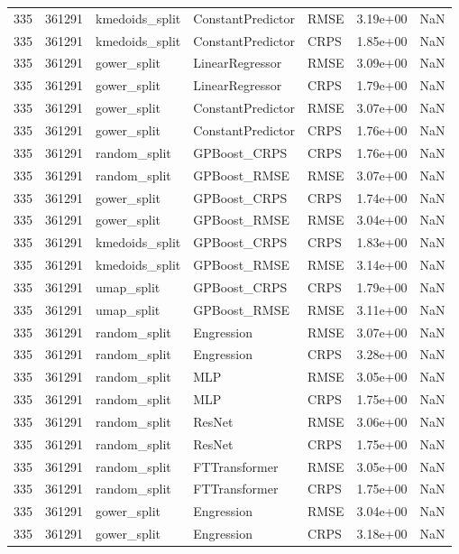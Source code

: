 \begin{tabular}{rrlllrr}
335 & 361291 & kmedoids\_split & ConstantPredictor & RMSE & 3.19e+00 & NaN \\
335 & 361291 & kmedoids\_split & ConstantPredictor & CRPS & 1.85e+00 & NaN \\
335 & 361291 & gower\_split & LinearRegressor & RMSE & 3.09e+00 & NaN \\
335 & 361291 & gower\_split & LinearRegressor & CRPS & 1.79e+00 & NaN \\
335 & 361291 & gower\_split & ConstantPredictor & RMSE & 3.07e+00 & NaN \\
335 & 361291 & gower\_split & ConstantPredictor & CRPS & 1.76e+00 & NaN \\
335 & 361291 & random\_split & GPBoost\_CRPS & CRPS & 1.76e+00 & NaN \\
335 & 361291 & random\_split & GPBoost\_RMSE & RMSE & 3.07e+00 & NaN \\
335 & 361291 & gower\_split & GPBoost\_CRPS & CRPS & 1.74e+00 & NaN \\
335 & 361291 & gower\_split & GPBoost\_RMSE & RMSE & 3.04e+00 & NaN \\
335 & 361291 & kmedoids\_split & GPBoost\_CRPS & CRPS & 1.83e+00 & NaN \\
335 & 361291 & kmedoids\_split & GPBoost\_RMSE & RMSE & 3.14e+00 & NaN \\
335 & 361291 & umap\_split & GPBoost\_CRPS & CRPS & 1.79e+00 & NaN \\
335 & 361291 & umap\_split & GPBoost\_RMSE & RMSE & 3.11e+00 & NaN \\
335 & 361291 & random\_split & Engression & RMSE & 3.07e+00 & NaN \\
335 & 361291 & random\_split & Engression & CRPS & 3.28e+00 & NaN \\
335 & 361291 & random\_split & MLP & RMSE & 3.05e+00 & NaN \\
335 & 361291 & random\_split & MLP & CRPS & 1.75e+00 & NaN \\
335 & 361291 & random\_split & ResNet & RMSE & 3.06e+00 & NaN \\
335 & 361291 & random\_split & ResNet & CRPS & 1.75e+00 & NaN \\
335 & 361291 & random\_split & FTTransformer & RMSE & 3.05e+00 & NaN \\
335 & 361291 & random\_split & FTTransformer & CRPS & 1.75e+00 & NaN \\
335 & 361291 & gower\_split & Engression & RMSE & 3.04e+00 & NaN \\
335 & 361291 & gower\_split & Engression & CRPS & 3.18e+00 & NaN \\

\end{tabular}
